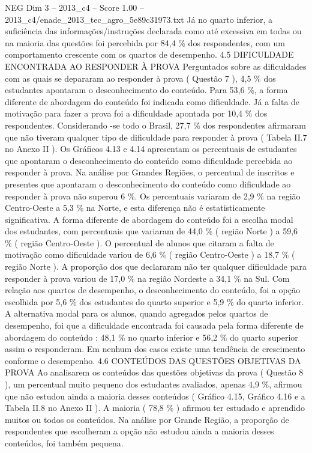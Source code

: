 \begin{textsample}{NEG Dim 3 – 2013\_c4 – Score 1.00 – 2013\_c4/enade\_2013\_tec\_agro\_5e89c31973.txt}
Já no quarto inferior, a suficiência das informações/instruções declarada como até excessiva em todas ou na maioria das questões foi percebida por 84,4 \% dos respondentes, com um comportamento crescente com os quartos de desempenho. 4.5 DIFICULDADE ENCONTRADA AO RESPONDER À PROVA Perguntados sobre as dificuldades com as quais se depararam ao responder à prova ( Questão 7 ), 4,5 \% dos estudantes apontaram o desconhecimento do conteúdo.
Para 53,6 \%, a forma diferente de abordagem do conteúdo foi indicada como dificuldade.
Já a falta de motivação para fazer a prova foi a dificuldade apontada por 10,4 \% dos respondentes.
Considerando -se todo o Brasil, 27,7 \% dos respondentes afirmaram que não tiveram qualquer tipo de dificuldade para responder à prova ( Tabela II.7 no Anexo II ).
Os Gráficos 4.13 e 4.14 apresentam os percentuais de estudantes que apontaram o desconhecimento do conteúdo como dificuldade percebida ao responder à prova.
Na análise por Grandes Regiões, o percentual de inscritos e presentes que apontaram o desconhecimento do conteúdo como dificuldade ao responder à prova não superou 6 \%.
Os percentuais variaram de 2,9 \% na região Centro-Oeste a 5,3 \% na Norte, e esta diferença não é estatisticamente significativa.
A forma diferente de abordagem do conteúdo foi a escolha modal dos estudantes, com percentuais que variaram de 44,0 \% ( região Norte ) a 59,6 \% ( região Centro-Oeste ).
O percentual de alunos que citaram a falta de motivação como dificuldade variou de 6,6 \% ( região Centro-Oeste ) a 18,7 \% ( região Norte ).
A proporção dos que declararam não ter qualquer dificuldade para responder à prova variou de 17,0 \% na região Nordeste a 34,1 \% na Sul.
Com relação aos quartos de desempenho, o desconhecimento do conteúdo, foi a opção escolhida por 5,6 \% dos estudantes do quarto superior e 5,9 \% do quarto inferior.
A alternativa modal para os alunos, quando agregados pelos quartos de desempenho, foi que a dificuldade encontrada foi causada pela forma diferente de abordagem do conteúdo : 48,1 \% no quarto inferior e 56,2 \% do quarto superior assim o responderam.
Em nenhum dos casos existe uma tendência de crescimento conforme o desempenho. 4.6 CONTEÚDOS DAS QUESTÕES OBJETIVAS DA PROVA Ao analisarem os conteúdos das questões objetivas da prova ( Questão 8 ), um percentual muito pequeno dos estudantes avaliados, apenas 4,9 \%, afirmou que não estudou ainda a maioria desses conteúdos ( Gráfico 4.15, Gráfico 4.16 e a Tabela II.8 no Anexo II ).
A maioria ( 78,8 \% ) afirmou ter estudado e aprendido muitos ou todos os conteúdos.
Na análise por Grande Região, a proporção de respondentes que escolheram a opção não estudou ainda a maioria desses conteúdos, foi também pequena.

\end{textsample}
